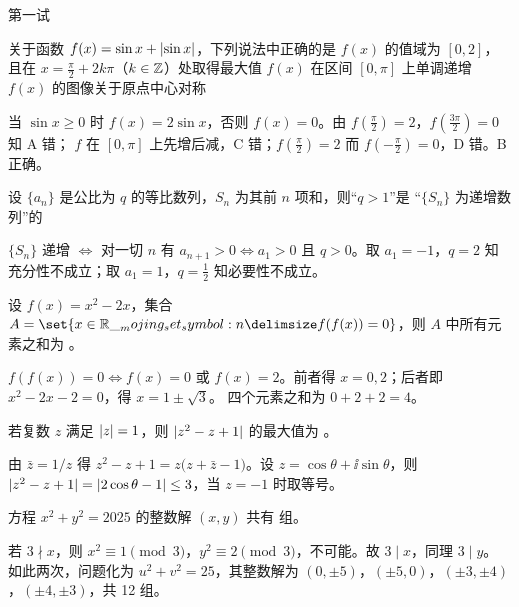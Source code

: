 \documentclass{mojing-exam}
\begin{document}
\begin{paper}[time={8:00—9:20}, full=120]{第一试}
\begin{questions}
\question 关于函数 $f(x)=\sin x+\lvert\sin x\rvert$，下列说法中正确的是 \paren[B]
        {$f(x)$ 的值域为 $[0,2]$，且在 $x=\frac{\pi}{2}+2k\pi$（$k\in\mathbb{Z}$）处取得最大值}
        {$f(x)$ 在区间 $[0,\pi]$ 上单调递增}
        {$f(x)$ 的图像关于原点中心对称}
\begin{solution}
当 $\sin x\ge0$ 时 $f(x)=2\sin x$，否则 $f(x)=0$。由 $f(\frac{\pi}{2})=2$，$f(\frac{3\pi}{2})=0$ 知 A 错；
$f$ 在 $[0,\pi]$ 上先增后减，C 错；$f(\frac\pi2)=2$ 而 $f(-\frac\pi2)=0$，D 错。B 正确。
\end{solution}

\question 设 $\{a_n\}$ 是公比为 $q$ 的等比数列，$S_n$ 为其前 $n$ 项和，则“$q>1$”是
“$\{S_n\}$ 为递增数列”的 \paren[D]
\begin{solution}
$\{S_n\}$ 递增 $\iff$ 对一切 $n$ 有 $a_{n+1}>0\iff a_1>0$ 且 $q>0$。取 $a_1=-1$，$q=2$ 知
充分性不成立；取 $a_1=1$，$q=\frac12$ 知必要性不成立。
\end{solution}
\end{questions}


\begin{questions}
\question 设 $f(x)=x^2-2x$，集合 $A=\set{x\in\R\given f(f(x))=0}$，则 $A$ 中所有元素之和为
\fillin[$4$]。
\begin{solution}
$f(f(x))=0\iff f(x)=0$ 或 $f(x)=2$。前者得 $x=0,2$；后者即 $x^2-2x-2=0$，得 $x=1\pm\sqrt3$。
四个元素之和为 $0+2+2=4$。
\end{solution}

\question 若复数 $z$ 满足 $\lvert z\rvert=1$，则 $\lvert z^2-z+1\rvert$ 的最大值为 \fillin[$3$]。
\begin{solution}
由 $\bar z=1/z$ 得 $z^2-z+1=z\bigl(z+\bar z-1\bigr)$。设 $z=\cos\theta+\ii\sin\theta$，则
$\lvert z^2-z+1\rvert=\lvert2\cos\theta-1\rvert\le3$，当 $z=-1$ 时取等号。
\end{solution}

\question 方程 $x^2+y^2=2025$ 的整数解 $(x,y)$ 共有 \fillin[$12$][4em] 组。
\begin{solution}
若 $3\nmid x$，则 $x^2\equiv1\pmod3$，$y^2\equiv2\pmod3$，不可能。故 $3\mid x$，同理 $3\mid y$。
如此两次，问题化为 $u^2+v^2=25$，其整数解为 $(0,\pm5)$，$(\pm5,0)$，$(\pm3,\pm4)$，$(\pm4,\pm3)$，共 12 组。
\end{solution}


\end{questions}
\end{paper}
\end{document}
